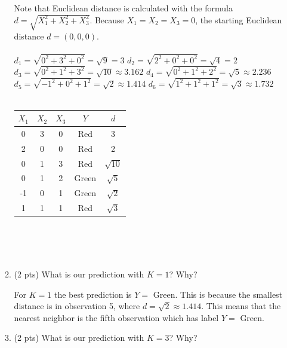 \documentclass[a4paper]{article}
\theoremstyle{definition}
\newenvironment{soln}{
    \leavevmode\color{blue}\ignorespaces
}{}
\begin{document}
\begin{enumerate}
\begin{enumerate}
	\begin{soln}
            Note that Euclidean distance is calculated with the formula $d = \sqrt{X^2_1 + X^2_2 + X^2_3}$. Because $X_1 = X_2 = X_3 = 0$, the starting Euclidean distance $d = (0,0,0)$.\\\\
            $d_1 = \sqrt{0^2 + 3^2 + 0^2} = \sqrt{9} = 3$\qquad \qquad \quad
            $d_2 = \sqrt{2^2 + 0^2 + 0^2} = \sqrt{4} = 2$\\
            $d_3 = \sqrt{0^2 + 1^2 + 3^2} = \sqrt{10} \approx 3.162$\qquad \quad
            $d_4 = \sqrt{0^2 + 1^2 + 2^2} = \sqrt{5} \approx  2.236$\\
            $d_5 = \sqrt{-1^2 + 0^2 + 1^2} = \sqrt{2} \approx 1.414$\qquad \quad
            $d_6 = \sqrt{1^2 + 1^2 + 1^2} = \sqrt{3} \approx 1.732$\\\\
            \begin{center}
	\begin{tabular}{ c  c  c  c  c}
		\hline
		$X_{1}$ & $X_{2}$ & $X_{3}$ & $Y$ & $d$\\ \hline
		0 & 3 & 0 & Red & 3\\
		2 & 0 & 0 & Red & 2\\
		0 & 1 & 3 & Red & $\sqrt{10}$\\
		0 & 1 & 2 & Green & $\sqrt{5}$\\
		-1 & 0 & 1 & Green & $\sqrt{2}$\\
		1 & 1 & 1 & Red & $\sqrt{3}$\\
		\hline
	\end{tabular}
        \end{center}
        \end{soln}\\\\
 \\
	\item (2 pts) What is our prediction with $K=1$? Why?\\
	
	\begin{soln}
            For $K = 1$ the best prediction is $Y =$ Green. This is because the smallest distance is in observation 5, where $d = \sqrt{2} \approx 1.414$. This means that the nearest neighbor is the fifth observation which has label $Y =$ Green. 
        \end{soln}\\
	
	\item (2 pts) What is our prediction with $K=3$? Why?\\
	

\end{enumerate}
\end{enumerate}
\end{document}

